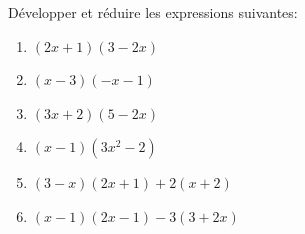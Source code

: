 \begin{exo}[Développement]
	Développer et réduire les expressions suivantes:
	\begin{enumerate}[label=\alph*)]
		\item $(2x + 1)(3 - 2x)$
		\item $(x - 3)(-x - 1)$
		\item $(3x + 2)(5 - 2x)$
		\item $(x - 1)(3x^{2} - 2)$
		\item $(3 - x)(2x + 1) + 2(x + 2)$
		\item $(x - 1)(2x - 1) - 3(3 + 2x)$
	\end{enumerate}
\end{exo}
